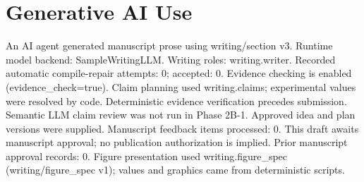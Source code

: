 \section*{Generative AI Use}
An AI agent generated manuscript prose using writing/section v3.
Runtime model backend: SampleWritingLLM.
Writing roles: writing.writer. Recorded automatic compile-repair attempts: 0; accepted: 0.
Evidence checking is enabled (evidence\_check=true). Claim planning used writing.claims; experimental values were resolved by code. Deterministic evidence verification precedes submission. Semantic LLM claim review was not run in Phase 2B-1.
Approved idea and plan versions were supplied. Manuscript feedback items processed: 0. This draft awaits manuscript approval; no publication authorization is implied.
Prior manuscript approval records: 0.
Figure presentation used writing.figure\_spec (writing/figure\_spec v1); values and graphics came from deterministic scripts.
\ifdefined\pdfinfo{}\fi
